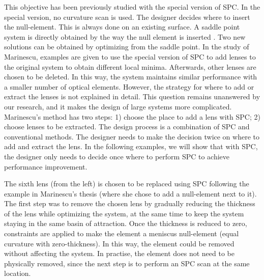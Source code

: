 This objective has been previously studied with the special version of SPC. In the special version, no curvature scan is used. The designer decides where to insert the null-element. This is always done on an existing surface. A saddle point system is directly obtained by the way the null element is inserted \cite{BociortSPCSexplained}. Two new solutions can be obtained by optimizing from the saddle point. In the study of Marinescu\cite{OanaThesis2006}\cite{OanaOEngPart2}, examples are given to use the special version of SPC to add lenses to the original system to obtain different local minima. Afterwards, other lenses are chosen to be deleted. In this way, the system maintains similar performance with a smaller number of optical elements. However, the strategy for where to add or extract the lenses is not explained in detail. This question remains unanswered by our research, and it makes the design of large systems more complicated. Marinescu's method has two steps: 1) choose the place to add a lens with SPC; 2) choose lenses to be extracted. The design process is a combination of SPC and conventional methods. The designer needs to make the decision twice on where to add and extract the lens. In the following examples, we will show that with SPC, the designer only needs to decide once where to perform SPC to achieve performance improvement. 

The sixth lens (from the left) is chosen to be replaced using SPC following the example in Marinescu's thesis (where she chose to add a null-element next to it). The first step was to remove the chosen lens by gradually reducing the thickness of the lens while optimizing the system, at the same time to keep the system staying in the same basin of attraction. Once the thickness is reduced to zero, constraints are applied to make the element a meniscus null-element (equal curvature with zero-thickness). In this way, the element could be removed without affecting the system. In practise, the element does not need to be physically removed, since the next step is to perform an SPC scan at the same location. 

